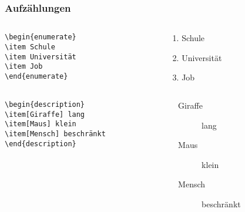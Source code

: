 \begin{frame}[fragile]
  \frametitle{Aufzählungen}

  \begin{Beispiel}
    \begin{columns}
      \begin{column}{0.4\linewidth}
\begin{lstlisting}
\begin{enumerate}
\item Schule
\item Universität
\item Job
\end{enumerate}
\end{lstlisting}
      \end{column}
      \begin{column}{0.4\linewidth}
        \begin{enumerate}[1. ]
        \item Schule
        \item Universität
        \item Job
        \end{enumerate}
      \end{column}
    \end{columns}

    \begin{columns}
      \begin{column}{0.4\linewidth}
\begin{lstlisting}
\begin{description}
\item[Giraffe] lang
\item[Maus] klein
\item[Mensch] beschränkt
\end{description}
\end{lstlisting}
      \end{column}
      \begin{column}{0.4\linewidth}
        \hspace*{-4em}
        \parbox{\linewidth}{
          \begin{description}
            \item[Giraffe] lang
            \item[Maus] klein
            \item[Mensch] beschränkt
          \end{description}
        }
      \end{column}
    \end{columns}
  \end{Beispiel}

\end{frame}

